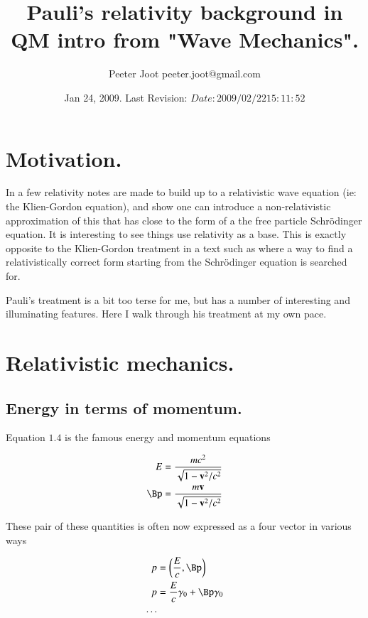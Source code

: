 \documentclass{article}
\title{ Pauli's relativity background in QM intro from "Wave Mechanics". }
\author{Peeter Joot \quad peeter.joot@gmail.com}
\date{ Jan 24, 2009.  Last Revision: $Date: 2009/02/22 15:11:52 $ }
\newcommand{\Sch}[0]{{Schr\"{o}dinger} }
\begin{document}
\maketitle{}

\tableofcontents

\section{ Motivation. }

In \cite{pauli2000wm} a few relativity notes are made to build up to 
a relativistic wave equation (ie: the Klien-Gordon equation),
and show one can introduce a non-relativistic approximation of this
that has close to the form of a the free particle \Sch equation.  It 
is interesting to see things use relativity as a base.  This is exactly
opposite to the Klien-Gordon treatment in a text such as
\cite{srednicki2007qft} where a way to find a 
relativistically correct form starting from the \Sch equation is searched for.

Pauli's treatment is a bit too terse for me, but has a number of
interesting and illuminating features.  Here I walk through his treatment
at my own pace.

\section{ Relativistic mechanics. }

\subsection{ Energy in terms of momentum. }

Equation $1.4$ is the famous energy and momentum equations

\begin{align}\label{eqn:p1_4}
E &= \frac{ m c^2 }{\sqrt{1 - \Bv^2/c^2}} \\
\Bp &= \frac{ m \Bv }{\sqrt{1 - \Bv^2/c^2}} \\
\end{align}

These pair of these quantities is often now expressed as a four vector in various ways

\begin{align*}
p &= \left(\frac{E}{c}, \Bp \right) \\
p &= \frac{E}{c} \gamma_0 + \Bp \gamma_0 \\
\cdots
\end{align*}
\end{document}
